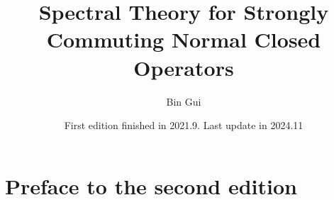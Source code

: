\documentclass[12pt,b5paper,notitlepage]{article}
\title{Spectral Theory for Strongly Commuting Normal Closed Operators}
\author{{\sc Bin Gui}
}
\date{\footnotesize First edition finished in  2021.9. Last update in 2024.11}
\theoremstyle{definition}
\theoremstyle{plain}
\numberwithin{equation}{section}
\begin{document}
\sloppy %
	
	
	
	\maketitle
	
	
\newcommand\blfootnote[1]{%
	\begingroup
	\renewcommand\thefootnote{}\footnote{#1}%
	\addtocounter{footnote}{-1}%
	\endgroup
}

\vspace{-0.5cm}








\makeatletter
\newcommand*{\toccontents}{}
\makeatother
\toccontents



	
	
	
	

	
	

	
	
	
	
	
	
	
	
	

	
\newpage

\section*{Preface to the second edition}
\end{document}
